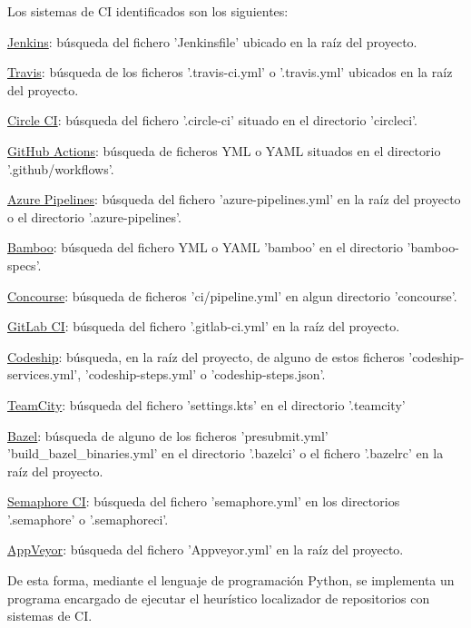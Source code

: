 Los sistemas de CI identificados son los siguientes:
\begin{compactitem}
    \item \underline{Jenkins}: búsqueda del fichero 'Jenkinsfile' ubicado en la raíz del proyecto.
    \item \underline{Travis}: búsqueda de los ficheros '.travis-ci.yml' o '.travis.yml' ubicados en la raíz del proyecto.
    \item \underline{Circle CI}: búsqueda del fichero '.circle-ci' situado en el directorio 'circleci'.
    \item \underline{GitHub Actions}: búsqueda de ficheros YML o YAML situados en el directorio '.github/workflows'.
    \item \underline{Azure Pipelines}: búsqueda del fichero 'azure-pipelines.yml' en la raíz del proyecto o el directorio '.azure-pipelines'.
    \item \underline{Bamboo}: búsqueda del fichero YML o YAML 'bamboo' en el directorio 'bamboo-specs'.
    \item \underline{Concourse}: búsqueda de ficheros 'ci/pipeline.yml' en algun directorio 'concourse'.
    \item \underline{GitLab CI}: búsqueda del fichero '.gitlab-ci.yml' en la raíz del proyecto.
    \item \underline{Codeship}: búsqueda, en la raíz del proyecto, de alguno de estos ficheros 'codeship-services.yml', 'codeship-steps.yml' o 'codeship-steps.json'.
    \item \underline{TeamCity}: búsqueda del fichero 'settings.kts' en el directorio '.teamcity'
    \item \underline{Bazel}: búsqueda de alguno de los ficheros 'presubmit.yml' 'build\_bazel\_binaries.yml' en el directorio '.bazelci' o el fichero '.bazelrc' en la raíz del proyecto.
    \item \underline{Semaphore CI}: búsqueda del fichero 'semaphore.yml' en los directorios '.semaphore' o '.semaphoreci'.
    \item \underline{AppVeyor}: búsqueda del fichero 'Appveyor.yml' en la raíz del proyecto.
\end{compactitem}
	
De esta forma, mediante el lenguaje de programación Python, se implementa un programa encargado de ejecutar el heurístico localizador de repositorios con sistemas de CI.

